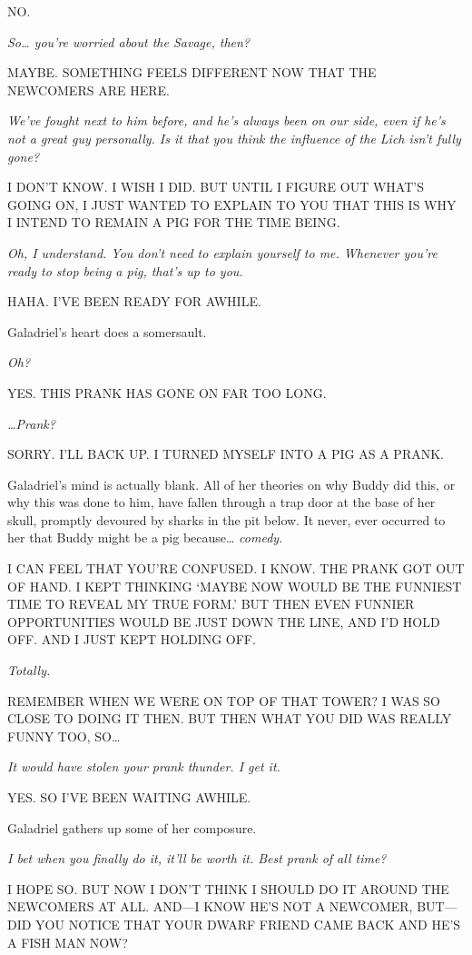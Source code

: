 \documentclass[smalldemyvopaper,11pt,twoside,onecolumn,openright,extrafontsizes]{memoir}
\begin{document}
NO.

\emph{So\ldots{} you're worried about the Savage, then?}

MAYBE. SOMETHING FEELS DIFFERENT NOW THAT THE NEWCOMERS ARE HERE.

\emph{We've fought next to him before, and he's always been on our side,
even if he's not a great guy personally. Is it that you think the
influence of the Lich isn't fully gone?}

I DON'T KNOW. I WISH I DID. BUT UNTIL I FIGURE OUT WHAT'S GOING ON, I
JUST WANTED TO EXPLAIN TO YOU THAT THIS IS WHY I INTEND TO REMAIN A PIG
FOR THE TIME BEING.

\emph{Oh, I understand. You don't need to explain yourself to me.
Whenever you're ready to stop being a pig, that's up to you.}

HAHA. I'VE BEEN READY FOR AWHILE.

Galadriel's heart does a somersault.

\emph{Oh?}

YES. THIS PRANK HAS GONE ON FAR TOO LONG.

\emph{\ldots Prank?}

SORRY. I'LL BACK UP. I TURNED MYSELF INTO A PIG AS A PRANK.

Galadriel's mind is actually blank. All of her theories on why Buddy did
this, or why this was done to him, have fallen through a trap door at
the base of her skull, promptly devoured by sharks in the pit below. It
never, ever occurred to her that Buddy might be a pig because\ldots{}
\emph{comedy.}

I CAN FEEL THAT YOU'RE CONFUSED. I KNOW. THE PRANK GOT OUT OF HAND. I
KEPT THINKING `MAYBE NOW WOULD BE THE FUNNIEST TIME TO REVEAL MY TRUE
FORM.' BUT THEN EVEN FUNNIER OPPORTUNITIES WOULD BE JUST DOWN THE LINE,
AND I'D HOLD OFF. AND I JUST KEPT HOLDING OFF.

\emph{Totally.}

REMEMBER WHEN WE WERE ON TOP OF THAT TOWER? I WAS SO CLOSE TO DOING IT
THEN. BUT THEN WHAT YOU DID WAS REALLY FUNNY TOO, SO\ldots{}

\emph{It would have stolen your prank thunder. I get it.}

YES. SO I'VE BEEN WAITING AWHILE.

Galadriel gathers up some of her composure.

\emph{I bet when you finally do it, it'll be worth it. Best prank of all
time?}

I HOPE SO. BUT NOW I DON'T THINK I SHOULD DO IT AROUND THE NEWCOMERS AT
ALL. AND---I KNOW HE'S NOT A NEWCOMER, BUT---DID YOU NOTICE THAT YOUR
DWARF FRIEND CAME BACK AND HE'S A FISH MAN NOW?
\end{document}
